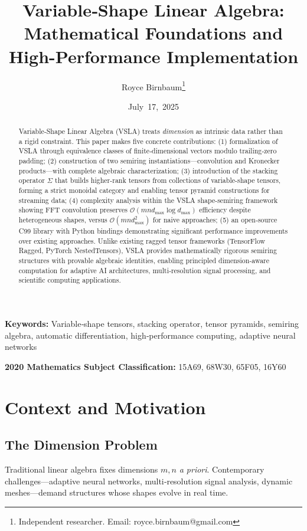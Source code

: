 \documentclass[11pt]{article}
\title{Variable‑Shape Linear Algebra: Mathematical Foundations and High-Performance Implementation}
\author{Royce Birnbaum\thanks{Independent researcher. Email: royce.birnbaum@gmail.com}}
\date{July 17, 2025}
\newcommand{\keywords}[1]{\textbf{Keywords:} #1}
\newcommand{\msc}[1]{\textbf{2020 Mathematics Subject Classification:} #1}
\begin{document}
\maketitle

\begin{abstract}
Variable‑Shape Linear Algebra (VSLA) treats \emph{dimension} as intrinsic data rather than a rigid constraint. This paper makes five concrete contributions: (1) formalization of VSLA through equivalence classes of finite‑dimensional vectors modulo trailing‑zero padding; (2) construction of two semiring instantiations—convolution and Kronecker products—with complete algebraic characterization; (3) introduction of the stacking operator $\Sigma$ that builds higher-rank tensors from collections of variable-shape tensors, forming a strict monoidal category and enabling tensor pyramid constructions for streaming data; (4) complexity analysis within the VSLA shape-semiring framework showing FFT convolution preserves $\mathcal{O}(mn d_{\max} \log d_{\max})$ efficiency despite heterogeneous shapes, versus $\mathcal{O}(mn d_{\max}^2)$ for naive approaches; (5) an open‑source C99 library with Python bindings demonstrating significant performance improvements over existing approaches. Unlike existing ragged tensor frameworks (TensorFlow Ragged, PyTorch NestedTensors), VSLA provides mathematically rigorous semiring structures with provable algebraic identities, enabling principled dimension‑aware computation for adaptive AI architectures, multi‑resolution signal processing, and scientific computing applications.
\end{abstract}

\vspace{0.5em}
\noindent\keywords{Variable‑shape tensors, stacking operator, tensor pyramids, semiring algebra, automatic differentiation, high‑performance computing, adaptive neural networks}

\noindent\msc{15A69, 68W30, 65F05, 16Y60}

\section{Context and Motivation}
\subsection{The Dimension Problem}
Traditional linear algebra fixes dimensions \(m,n\) \emph{a priori}.  Contemporary challenges—adaptive neural networks, multi‑resolution signal analysis, dynamic meshes—demand structures whose shapes evolve in real time.  
\end{document}
